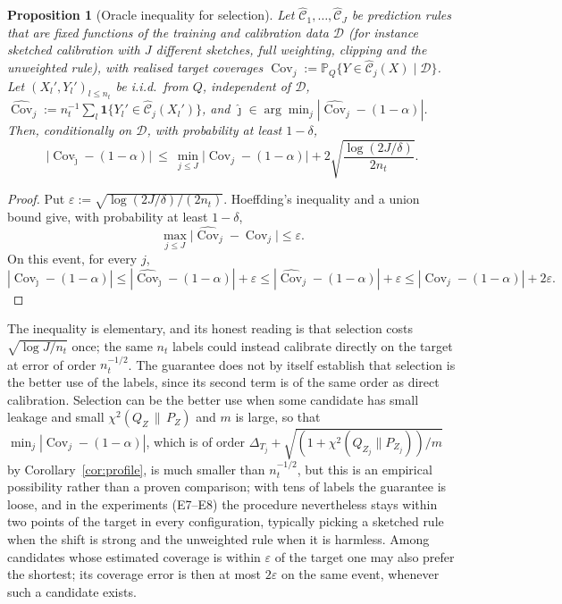 \documentclass[11pt,a4paper]{article}
\newcommand{\chisqZ}{\chi^2(Q_Z\,\|\,P_Z)}
\newcommand{\Cov}{\operatorname{Cov}}
\newcommand{\Prob}{\mathbb{P}}
\newcommand{\Cset}{\widehat{\mathcal C}}
\newcommand{\ind}{\mathbf 1}
\theoremstyle{plain}
\newtheorem{proposition}[theorem]{Proposition}
\theoremstyle{definition}
\theoremstyle{remark}
\begin{document}
\begin{proposition}[Oracle inequality for selection]\label{prop:select}
Let $\Cset_1,\dots,\Cset_J$ be prediction rules that are fixed functions of the training and calibration data $\mathcal D$ (for instance sketched calibration with $J$ different sketches, full weighting, clipping and the unweighted rule), with realised target coverages $\Cov_j:=\Prob_Q\{Y\in\Cset_j(X)\mid\mathcal D\}$. Let $(X_l',Y_l')_{l\le n_t}$ be i.i.d.\ from $Q$, independent of $\mathcal D$, $\widehat{\Cov}_j:=n_t^{-1}\sum_l\ind\{Y_l'\in\Cset_j(X_l')\}$, and $\hat\jmath\in\arg\min_j|\widehat{\Cov}_j-(1-\alpha)|$. Then, conditionally on $\mathcal D$, with probability at least $1-\delta$,
\[
\bigl|\Cov_{\hat\jmath}-(1-\alpha)\bigr|\ \le\ \min_{j\le J}\bigl|\Cov_j-(1-\alpha)\bigr|+2\sqrt{\frac{\log(2J/\delta)}{2n_t}} .
\]
\end{proposition}
\begin{proof}
Put $\varepsilon:=\sqrt{\log(2J/\delta)/(2n_t)}$. Hoeffding's inequality and a union bound give, with probability at least $1-\delta$,
\[
\max_{j\le J}\bigl|\widehat{\Cov}_j-\Cov_j\bigr|\le\varepsilon .
\]
On this event, for every $j$,
\[
|\Cov_{\hat\jmath}-(1-\alpha)|\le|\widehat{\Cov}_{\hat\jmath}-(1-\alpha)|+\varepsilon\le|\widehat{\Cov}_j-(1-\alpha)|+\varepsilon\le|\Cov_j-(1-\alpha)|+2\varepsilon .
\]
\end{proof}

The inequality is elementary, and its honest reading is that selection costs $\sqrt{\log J/n_t}$ once; the same $n_t$ labels could instead calibrate directly on the target at error of order $n_t^{-1/2}$. The guarantee does not by itself establish that selection is the better use of the labels, since its second term is of the same order as direct calibration. Selection can be the better use when some candidate has small leakage and small $\chisqZ$ and $m$ is large, so that $\min_j|\Cov_j-(1-\alpha)|$, which is of order $\Delta_{T_j}+\sqrt{(1+\chi^2(Q_{Z_j}\|P_{Z_j}))/m}$ by Corollary~\ref{cor:profile}, is much smaller than $n_t^{-1/2}$, but this is an empirical possibility rather than a proven comparison; with tens of labels the guarantee is loose, and in the experiments (E7--E8) the procedure nevertheless stays within two points of the target in every configuration, typically picking a sketched rule when the shift is strong and the unweighted rule when it is harmless. Among candidates whose estimated coverage is within $\varepsilon$ of the target one may also prefer the shortest; its coverage error is then at most $2\varepsilon$ on the same event, whenever such a candidate exists.
\end{document}
